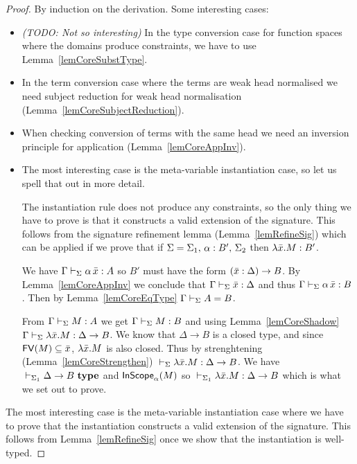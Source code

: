 \begin{proof}
    By induction on the derivation.
\if {}
    Some interesting cases:
    \begin{itemize}

	\item {\em (TODO: Not so interesting)} In the type conversion case for
	function spaces where the domains produce constraints, we have to use
	Lemma~\ref{lemCoreSubstType}.

	\item In the term conversion case where the terms are weak head
	normalised we need subject reduction for weak head normalisation
	(Lemma~\ref{lemCoreSubjectReduction}).

	\item When checking conversion of terms with the same head we need an
	inversion principle for application (Lemma~\ref{lemCoreAppInv}).

	\item The most interesting case is the meta-variable instantiation
	case, so let us spell that out in more detail.

	The instantiation rule does not produce any constraints, so the only
	thing we have to prove is that it constructs a valid extension of the
	signature. This follows from the signature refinement lemma
	(Lemma~\ref{lemRefineSig}) which can be applied if we prove that if
	$\Sigma = {\Sigma_1},\,{} {{\alpha} : {B'}},\,{} \Sigma_2$ then
	$\lambda \bar x.{} M : {B'}$.

	We have ${\Gamma} \vdash_{\Sigma} {\alpha \, \bar x} : {A}$ so $B'$ must
	have the form $(\bar x:\Delta)\to{} B$. By Lemma~\ref{lemCoreAppInv} we
	conclude that ${\Gamma} \vdash_{\Sigma} {\bar x} : {\Delta}$ and thus
	${\Gamma} \vdash_{\Sigma} {\alpha \, \bar x} : {B}$. Then by
	Lemma~\ref{lemCoreEqType} ${\Gamma} \vdash_{\Sigma}A=B$.

	From ${\Gamma} \vdash_{\Sigma} {M} : {A}$ we get ${\Gamma} \vdash_{\Sigma} {M} : {B}$ and using Lemma~\ref{lemCoreShadow}  ${\Gamma} \vdash_{\Sigma} {\lambda \bar x.{} M} : {\Delta \to B}$. We know that $\Delta \to B$ is a closed
	type, and since $\mathsf{FV}({M}) \subseteq \bar x$, $\lambda \bar x.{} M$ is also
	closed. Thus by strenghtening (Lemma~\ref{lemCoreStrengthen})
	${} \vdash_{\Sigma} {\lambda \bar x.{} M} : {\Delta \to B}$. We have
	${} \vdash_{\Sigma_1}\Delta \to B ~ \mathbf{type}$ and $\mathsf{InScope}_{\alpha}({M})$ so
	${} \vdash_{\Sigma_1} {\lambda \bar x.{} M} : {\Delta \to B}$ which is
	what we set out to prove.

    \end{itemize}
\else
    The most interesting case is the meta-variable instantiation case where we
    have to prove that the instantiation constructs a valid extension of the
    signature. This follows from Lemma~\ref{lemRefineSig} once we show that
    the instantiation is well-typed.
\fi
\end{proof}

